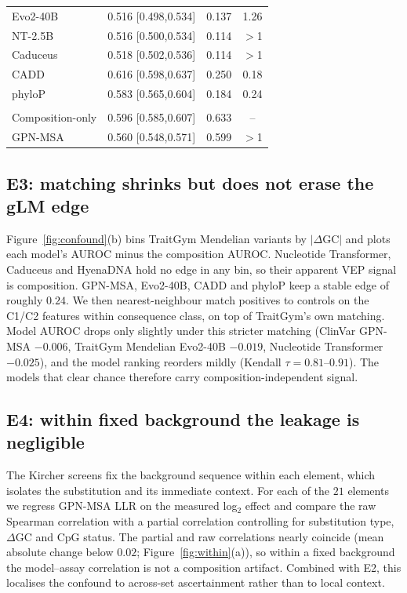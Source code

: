 \documentclass[pmlr]{jmlr}
\begin{document}
\begin{table}[t]
\begin{tabular}{lccc}
\quad Evo2-40B & 0.516 [0.498,0.534] & 0.137 & 1.26 \\
\quad NT-2.5B & 0.516 [0.500,0.534] & 0.114 & $>$1 \\
\quad Caduceus & 0.518 [0.502,0.536] & 0.114 & $>$1 \\
\quad CADD & 0.616 [0.598,0.637] & 0.250 & 0.18 \\
\quad phyloP & 0.583 [0.565,0.604] & 0.184 & 0.24 \\
\addlinespace
\multicolumn{4}{l}{\emph{GLRB eQTL}}\\
\quad Composition-only & 0.596 [0.585,0.607] & 0.633 & -- \\
\quad GPN-MSA & 0.560 [0.548,0.571] & 0.599 & $>$1 \\
\bottomrule
\end{tabular}
\end{table}

\subsection{E3: matching shrinks but does not erase the gLM edge}
\label{sec:e3}

Figure~\ref{fig:confound}(b) bins TraitGym Mendelian variants by $|\Delta\mathrm{GC}|$ and
plots each model's AUROC minus the composition AUROC. Nucleotide Transformer, Caduceus and
HyenaDNA hold no edge in any bin, so their apparent VEP signal is composition. GPN-MSA,
Evo2-40B, CADD and phyloP keep a stable edge of roughly $0.24$. We then nearest-neighbour
match positives to controls on the C1/C2 features within consequence class, on top of
TraitGym's own matching. Model AUROC drops only slightly under this stricter matching
(ClinVar GPN-MSA $-0.006$, TraitGym Mendelian Evo2-40B $-0.019$, Nucleotide Transformer
$-0.025$), and the model ranking reorders mildly (Kendall $\tau=0.81$--$0.91$). The models
that clear chance therefore carry composition-independent signal.

\subsection{E4: within fixed background the leakage is negligible}
\label{sec:e4}

The Kircher screens fix the background sequence within each element, which isolates the
substitution and its immediate context. For each of the $21$ elements we regress GPN-MSA LLR
on the measured log$_2$ effect and compare the raw Spearman correlation with a partial
correlation controlling for substitution type, $\Delta\mathrm{GC}$ and CpG status. The
partial and raw correlations nearly coincide (mean absolute change below $0.02$;
Figure~\ref{fig:within}(a)), so within a fixed background the model--assay correlation is not
a composition artifact. Combined with E2, this localises the confound to across-set
ascertainment rather than to local context.
\end{document}
